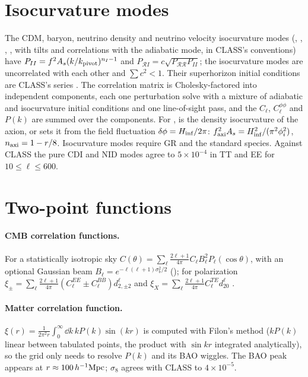 \section{Isocurvature modes}\label{sec:cmb-isocurvature}

The CDM, baryon, neutrino density and neutrino velocity isocurvature modes (, ,
, , with tilts  and correlations  with the adiabatic mode, in
CLASS's conventions) have $P_{II}=f^2A_s(k/k_{\rm pivot})^{n_I-1}$ and $P_{\mathcal RI}=c\sqrt{P_{\mathcal R\mathcal R}
P_{II}}$; the isocurvature modes are uncorrelated with each other and $\sum c^2<1$. Their superhorizon initial
conditions are CLASS's series \cite{BucherMoodleyTurok2000}. The correlation matrix is Cholesky-factored into
independent components, each one perturbation solve with a mixture of adiabatic and isocurvature initial conditions
and one line-of-sight pass, and the $C_\ell$, $C_\ell^{\phi\phi}$ and $P(k)$ are summed over the components. For
,  is the density isocurvature of the axion, or  sets it from
the field fluctuation $\delta\phi=H_{\rm inf}/2\pi$: $f_{\rm axi}^2A_s=H_{\rm inf}^2/(\pi^2\phi_i^2)$,
$n_{\rm axi}=1-r/8$. Isocurvature modes require GR and the standard species. Against CLASS the pure CDI and NID modes
agree to $5\times10^{-4}$ in TT and EE for $10\le\ell\le600$.

\section{Two-point functions}\label{sec:cmb-twopoint}

\paragraph*{CMB correlation functions.} For a statistically isotropic sky
$C(\theta)=\sum_\ell\frac{2\ell+1}{4\pi}C_\ell B_\ell^2P_\ell(\cos\theta)$, with an optional Gaussian beam
$B_\ell=e^{-\ell(\ell+1)\sigma_b^2/2}$ (); for polarization
$\xi_\pm=\sum_\ell\frac{2\ell+1}{4\pi}(C_\ell^{EE}\pm C_\ell^{BB})d^\ell_{2,\pm2}$ and
$\xi_X=\sum_\ell\frac{2\ell+1}{4\pi}C_\ell^{TE}d^\ell_{20}$ \cite{Challinor2005}.

\paragraph*{Matter correlation function.} $\xi(r)=\frac{1}{2\pi^2r}\int_0^\infty\dd k\,kP(k)\sin(kr)$ is computed with
Filon's method \cite{Filon1929} ($kP(k)$ linear between tabulated points, the product with $\sin kr$ integrated
analytically), so the grid only needs to resolve $P(k)$ and its BAO wiggles. The BAO peak appears at
$r\approx100\,h^{-1}\mathrm{Mpc}$; $\sigma_8$ agrees with CLASS to $4\times10^{-5}$.

